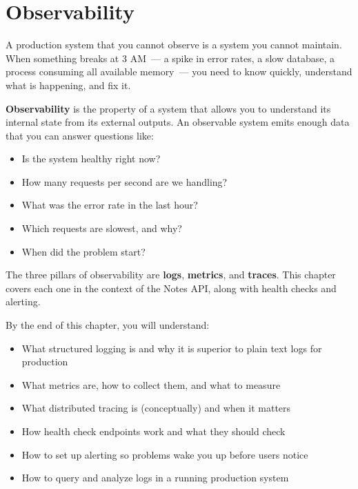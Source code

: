 \setcounter{chapter}{34}
\chapter{Observability}\label{ch:35-observability}

\chapterrule

A production system that you cannot observe is a system you cannot maintain. When something breaks at 3 AM~--- a spike in error rates, a slow database, a process consuming all available memory~--- you need to know quickly, understand what is happening, and fix it.

\textbf{Observability} is the property of a system that allows you to understand its internal state from its external outputs. An observable system emits enough data that you can answer questions like:

\begin{itemize}
\tightlist
\item
  Is the system healthy right now?
\item
  How many requests per second are we handling?
\item
  What was the error rate in the last hour?
\item
  Which requests are slowest, and why?
\item
  When did the problem start?
\end{itemize}

\noindent{}The three pillars of observability are \textbf{logs}, \textbf{metrics}, and \textbf{traces}. This chapter covers each one in the context of the Notes API, along with health checks and alerting.

\begin{objectives}

By the end of this chapter, you will understand:

\begin{itemize}
\tightlist
\item
  What structured logging is and why it is superior to plain text logs for production
\item
  What metrics are, how to collect them, and what to measure
\item
  What distributed tracing is (conceptually) and when it matters
\item
  How health check endpoints work and what they should check
\item
  How to set up alerting so problems wake you up before users notice
\item
  How to query and analyze logs in a running production system
\end{itemize}

\end{objectives}

